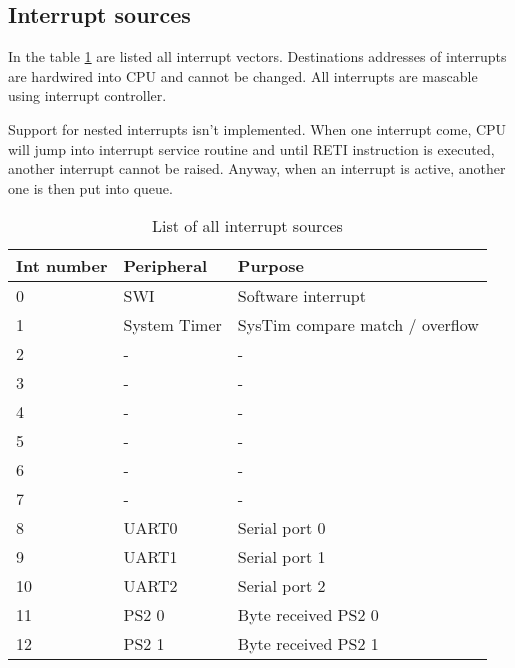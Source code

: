\subsection{Interrupt sources}

In the table \ref{tab:intsources} are listed all interrupt vectors. Destinations
addresses of interrupts are hardwired into CPU and cannot be changed. All
interrupts are mascable using interrupt controller.

Support for nested interrupts isn't implemented. When one interrupt come, CPU
will jump into interrupt service routine and until RETI instruction is executed,
another interrupt cannot be raised. Anyway, when an interrupt is active, another
one is then put into queue.

\begin{table}[h]
    \centering
    \begin{tabular}{|l|l|l|}
        \hline
        \textbf{Int number} & \textbf{Peripheral} & \textbf{Purpose}                \\ \hline
        0                   & SWI                 & Software interrupt              \\ \hline
        1                   & System Timer        & SysTim compare match / overflow \\ \hline
        2                   & -                   & -                               \\ \hline
        3                   & -                   & -                               \\ \hline
        4                   & -                   & -                               \\ \hline
        5                   & -                   & -                               \\ \hline
        6                   & -                   & -                               \\ \hline
        7                   & -                   & -                               \\ \hline
        8                   & UART0               & Serial port 0                   \\ \hline
        9                   & UART1               & Serial port 1                   \\ \hline
        10                  & UART2               & Serial port 2                   \\ \hline
        11                  & PS2 0               & Byte received PS2 0             \\ \hline
        12                  & PS2 1               & Byte received PS2 1             \\ \hline
    \end{tabular}
    \caption{List of all interrupt sources}
    \label{tab:intsources}
\end{table}
